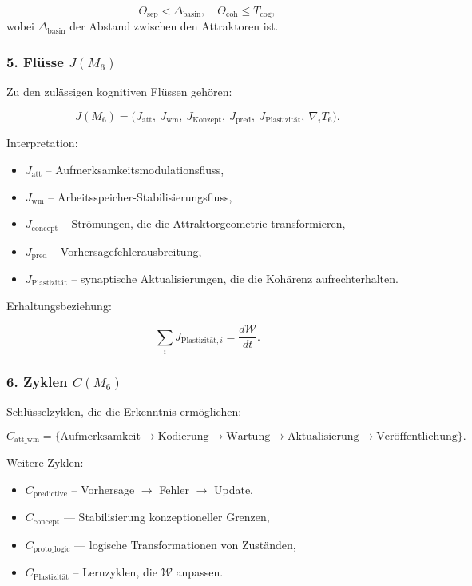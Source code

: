 \[
\Theta_{\mathrm{sep}} < \Delta_{\mathrm{basin}},
\quad
\Theta_{\mathrm{coh}} \le T_{\mathrm{cog}},
\]
wobei $\Delta_{\mathrm{basin}}$ der Abstand zwischen den Attraktoren ist.

\subsubsection*{5. Flüsse \texorpdfstring{$J(M_6)$}{J(M_6)}}

Zu den zulässigen kognitiven Flüssen gehören:

\[
J(M_6) =
\big(
J_{\mathrm{att}},\
J_{\mathrm{wm}},\
J_{\mathrm{Konzept}},\
J_{\mathrm{pred}},\
J_{\mathrm{Plastizität}},\
\nabla_i T_6
\Big).
\]

Interpretation:

\begin{itemize}
    \item $J_{\mathrm{att}}$ – Aufmerksamkeitsmodulationsfluss,
    \item $J_{\mathrm{wm}}$ – Arbeitsspeicher-Stabilisierungsfluss,
    \item $J_{\mathrm{concept}}$ – Strömungen, die die Attraktorgeometrie transformieren,
    \item $J_{\mathrm{pred}}$ – Vorhersagefehlerausbreitung,
    \item $J_{\mathrm{Plastizität}}$ – synaptische Aktualisierungen, die die Kohärenz aufrechterhalten.
\end{itemize}

Erhaltungsbeziehung:

\[
\sum_i J_{\mathrm{Plastizität},i} = \frac{d\mathcal{W}}{dt}.
\]

\subsubsection*{6. Zyklen \texorpdfstring{$C(M_6)$}{C(M_6)}}

Schlüsselzyklen, die die Erkenntnis ermöglichen:

\[
C_{\mathrm{att\_wm}}
=
\{\text{Aufmerksamkeit} \to \text{Kodierung} \to
\text{Wartung} \to \text{Aktualisierung} \to \text{Veröffentlichung}\}.
\]

Weitere Zyklen:

\begin{itemize}
    \item $C_{\mathrm{predictive}}$ – Vorhersage $\to$ Fehler $\to$ Update,
    \item $C_{\mathrm{concept}}$ — Stabilisierung konzeptioneller Grenzen,
    \item $C_{\mathrm{proto\_logic}}$ — logische Transformationen von Zuständen,
    \item $C_{\mathrm{Plastizität}}$ – Lernzyklen, die $\mathcal{W}$ anpassen.
\end{itemize}

